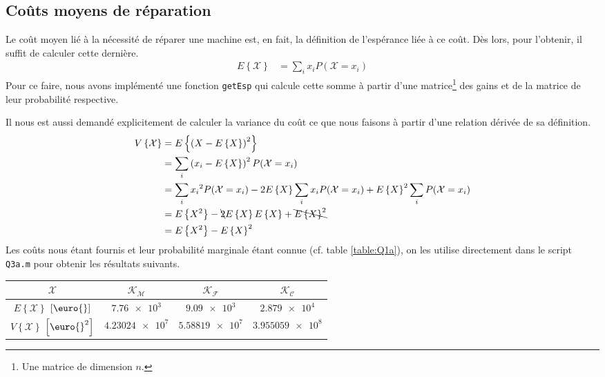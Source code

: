 \documentclass[a4paper, 12pt]{article}
\newcommand{\X}{\mathcal{X}}
\newcommand{\M}{\mathcal{M}}
\newcommand{\F}{\mathcal{F}}
\newcommand{\C}{\mathcal{C}}
\begin{document}
\subsection{Coûts moyens de réparation}
Le coût moyen lié à la nécessité de réparer une machine est, en fait, la définition de l'espérance liée à ce coût. Dès lors, pour l'obtenir, il suffit de calculer cette dernière.
\begin{align}
	E\left\{\X\right\} & = \sum_{i} x_i P(\X = x_i)
\end{align}
Pour ce faire, nous avons implémenté une fonction \texttt{getEsp} qui calcule cette somme à partir d'une matrice\footnote{Une matrice de dimension $n$.} des gains et de la matrice de leur probabilité respective. \par
Il nous est aussi demandé explicitement de calculer la variance du coût ce que nous faisons à partir d'une relation dérivée de sa définition.
\begin{align}
	V\left\{\X\right\} & = E\left\{\left(X - E\left\{X\right\}\right)^2\right\}                                                                               \\
	                   & = \sum_{i} \left(x_i - E\left\{X\right\}\right)^2 P(\X = x_i) \nonumber                                                              \\
	                   & = \sum_{i} {x_i}^2 P(\X = x_i) - 2 E\left\{X\right\} \sum_{i} {x_i} P(\X = x_i) + E\left\{X\right\}^2 \sum_{i} P(\X = x_i) \nonumber \\
	                   & = E\left\{X^2\right\} - \bcancel{2} E\left\{X\right\}E\left\{X\right\} + \bcancel{E\left\{X\right\}^2} \nonumber                     \\
	                   & = E\left\{X^2\right\} - E\left\{X\right\}^2
\end{align}
Les coûts nous étant fournis et leur probabilité marginale étant connue (cf. table \ref{table:Q1a}), on les utilise directement dans le script \texttt{Q3a.m} pour obtenir les résultats suivants.
\begin{table}[H]
	\centering
	\begin{tabular}{|c|c|c|c|}
		\hline
		                         $\X$                          & $\mathcal{K}_\M$  & $\mathcal{K}_\F$  &  $\mathcal{K}_\C$  \\ \hline
		 $E\left\{\X\right\}$ $\left[\textrm{\euro{}}\right]$  &  $\num{7.76e3}$   &  $\num{9.09e3}$   &  $\num{2.879e4}$   \\ \hline
		$V\left\{\X\right\}$ $\left[\textrm{\euro{}}^2\right]$ & $\num{4.23024e7}$ & $\num{5.58819e7}$ & $\num{3.955059e8}$ \\ \hline
	\end{tabular}
	\label{table:Q3a}
\end{table}
\end{document}
